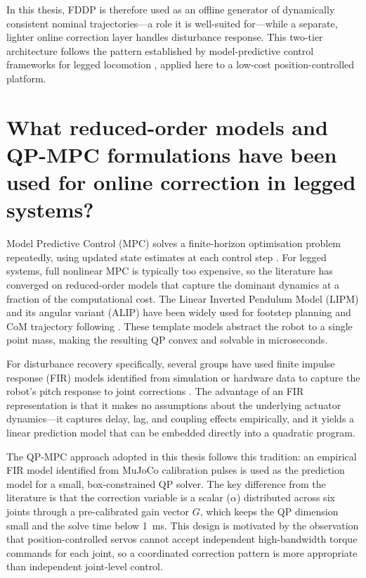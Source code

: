 \documentclass[12pt,a4paper]{report}
\begin{document}
In this thesis, FDDP is therefore used as an offline generator of dynamically consistent nominal trajectories---a role it is well-suited for---while a separate, lighter online correction layer handles disturbance response. This two-tier architecture follows the pattern established by model-predictive control frameworks for legged locomotion \cite{diCarlo2018_mpc, diederichs2024_mpc}, applied here to a low-cost position-controlled platform.
 
\section{What reduced-order models and QP-MPC formulations have been used for online correction in legged systems?}
 
Model Predictive Control (MPC) solves a finite-horizon optimisation problem repeatedly, using updated state estimates at each control step \cite{mayne2000constrained}. For legged systems, full nonlinear MPC is typically too expensive, so the literature has converged on reduced-order models that capture the dominant dynamics at a fraction of the computational cost. The Linear Inverted Pendulum Model (LIPM) and its angular variant (ALIP) have been widely used for footstep planning and CoM trajectory following \cite{gibson2022_alip, xiong2022_history}. These template models abstract the robot to a single point mass, making the resulting QP convex and solvable in microseconds.
 
For disturbance recovery specifically, several groups have used finite impulse response (FIR) models identified from simulation or hardware data to capture the robot's pitch response to joint corrections \cite{park2022_fir, choi2021_identification}. The advantage of an FIR representation is that it makes no assumptions about the underlying actuator dynamics---it captures delay, lag, and coupling effects empirically, and it yields a linear prediction model that can be embedded directly into a quadratic program.
 
The QP-MPC approach adopted in this thesis follows this tradition: an empirical FIR model identified from MuJoCo calibration pulses is used as the prediction model for a small, box-constrained QP solver. The key difference from the literature is that the correction variable is a scalar ($\alpha$) distributed across six joints through a pre-calibrated gain vector $G$, which keeps the QP dimension small and the solve time below \SI{1}{\milli\second}. This design is motivated by the observation that position-controlled servos cannot accept independent high-bandwidth torque commands for each joint, so a coordinated correction pattern is more appropriate than independent joint-level control.
 
\end{document}
